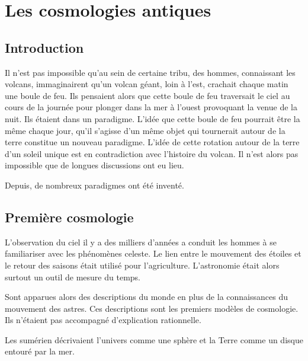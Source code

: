
\section{Les cosmologies antiques}


  \subsection{Introduction}
Il n'est pas impossible qu'au sein de certaine tribu, des hommes, connaissant les volcans, immaginairent qu'un volcan géant, loin à l'est, crachait chaque matin une boule de feu. Ils pensaient alors que cette boule de feu traversait le ciel au cours de la journée pour plonger dans la mer à l'ouest provoquant la venue de la nuit. Ils étaient dans un paradigme. L'idée que cette boule de feu pourrait être la même chaque jour, qu'il s'agisse d'un même objet qui tournerait autour de la terre constitue un nouveau paradigme. L'idée de cette rotation autour de la terre d'un soleil unique est en contradiction avec l'histoire du volcan. Il n'est alors pas impossible que de longues discussions ont eu lieu.

Depuis, de nombreux paradigmes ont été inventé.
  \subsection{Première cosmologie}

\begin{center}

\end{center}

L'observation du ciel il y a des milliers d'années a conduit les hommes à se familiariser avec les phénomènes celeste.
 Le lien entre le mouvement des étoiles et le retour des saisons était utilisé pour l'agriculture.
 L'astronomie était alors surtout un outil de mesure du temps.

 Sont apparues alors des descriptions du monde en plus de la connaissances du mouvement des astres.
Ces descriptions sont les premiers modèles de cosmologie. Ils n'étaient pas accompagné d'explication rationnelle.

Les sumérien décrivaient l'univers comme une sphère et la Terre comme un disque entouré par la mer. 

\begin{center}

\end{center}

